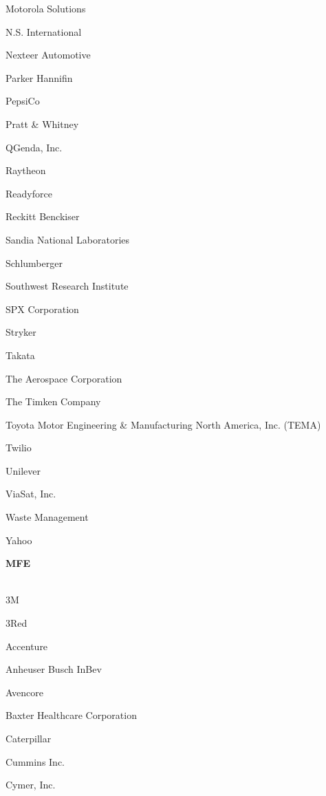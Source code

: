 \documentclass[twoside]{article}
\begin{document}
\begin{center}
\begin{multicols}{5}
\begin{FlushLeft}
\begin{compactitem}
\item Motorola Solutions
\item N.S. International
\item Nexteer Automotive
\item Parker Hannifin
\item PepsiCo
\item Pratt \& Whitney
\item QGenda, Inc.
\item Raytheon
\item Readyforce
\item Reckitt Benckiser
\item Sandia National Laboratories
\item Schlumberger
\item Southwest Research Institute
\item SPX Corporation
\item Stryker
\item Takata
\item The Aerospace Corporation
\item The Timken Company
\item Toyota Motor Engineering \& Manufacturing North America, Inc. (TEMA)
\item Twilio
\item Unilever
\item ViaSat, Inc.
\item Waste Management
\item Yahoo
\end{compactitem}
        \end{FlushLeft}
        \vspace{1em}
        {\fontsize{14}{16}\selectfont \bf MFE}\\
        \vspace{-1em}
        ~\hrulefill~
        \vspace{-.9em}
        \begin{FlushLeft}
        \begin{compactitem}
        \item 3M
\item 3Red
\item Accenture
\item Anheuser Busch InBev
\item Avencore
\item Baxter Healthcare Corporation
\item Caterpillar
\item Cummins Inc.
\item Cymer, Inc.

\end{compactitem}
\end{FlushLeft}
\end{multicols}
\end{center}
\end{document}
